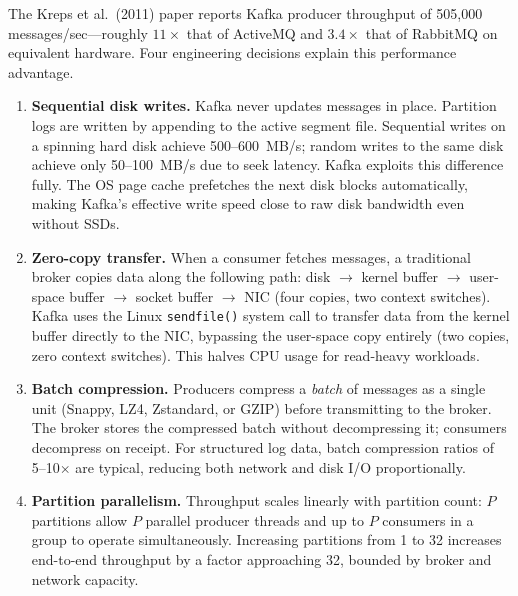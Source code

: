 The Kreps et al.\ (2011) paper reports Kafka producer throughput of
505{,}000 messages/sec---roughly $11\times$ that of ActiveMQ and $3.4\times$
that of RabbitMQ on equivalent hardware. Four engineering decisions explain
this performance advantage.

\begin{enumerate}
  \item \textbf{Sequential disk writes.} Kafka never updates messages in
        place. Partition logs are written by appending to the active
        segment file. Sequential writes on a spinning hard disk achieve
        500--600~MB/s; random writes to the same disk achieve only
        50--100~MB/s due to seek latency. Kafka exploits this difference
        fully. The OS page cache prefetches the next disk blocks
        automatically, making Kafka's effective write speed close to
        raw disk bandwidth even without SSDs.

  \item \textbf{Zero-copy transfer.} When a consumer fetches messages,
        a traditional broker copies data along the following path:
        disk $\to$ kernel buffer $\to$ user-space buffer $\to$ socket
        buffer $\to$ NIC (four copies, two context switches). Kafka
        uses the Linux \texttt{sendfile()} system call to transfer data
        from the kernel buffer directly to the NIC, bypassing the
        user-space copy entirely (two copies, zero context switches).
        This halves CPU usage for read-heavy workloads.

  \item \textbf{Batch compression.} Producers compress a \emph{batch}
        of messages as a single unit (Snappy, LZ4, Zstandard, or GZIP)
        before transmitting to the broker. The broker stores the
        compressed batch without decompressing it; consumers decompress
        on receipt. For structured log data, batch compression
        ratios of 5--10$\times$ are typical, reducing both network
        and disk I/O proportionally.

  \item \textbf{Partition parallelism.} Throughput scales linearly
        with partition count: $P$ partitions allow $P$ parallel
        producer threads and up to $P$ consumers in a group to
        operate simultaneously. Increasing partitions from 1 to 32
        increases end-to-end throughput by a factor approaching 32,
        bounded by broker and network capacity.
\end{enumerate}

